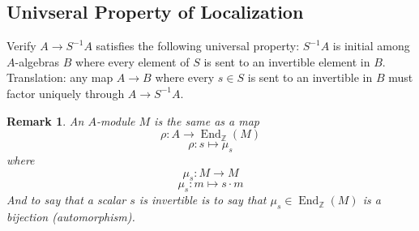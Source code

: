 \documentclass[hidelinks,12pt]{article}
\newtheorem*{remark}{Remark}
\newcommand{\Z}{\mathbb{Z}}
\newcommand{\End}{\operatorname{End}}
\begin{document}
\subsection{Univseral Property of Localization} Verify \(A\to S^{-1}A\) satisfies the following universal property: \(S^{-1}A\) is initial among \(A\)-algebras \(B\) where every element of \(S\) is sent to an invertible element in \(B\). Translation: any map \(A\to B\) where every \(s\in S\) is sent to an invertible in \(B\) must factor uniquely through \(A\to S^{-1}A\).
\begin{remark}
    An \(A\)-module \(M\) is the same as a map \[
        \rho:A\to\End_{\Z}(M)\]\[\rho: s\mapsto \mu_{s}
        \] where \[
        \mu_{s}:M\to M\] \[
        \mu_{s}:m\mapsto s\cdot m
    \]
    And to say that a scalar \(s\) is invertible is to say that \(\mu_{s}\in\End_{\Z}(M)\) is a bijection (automorphism).
\end{remark}
\end{document}
